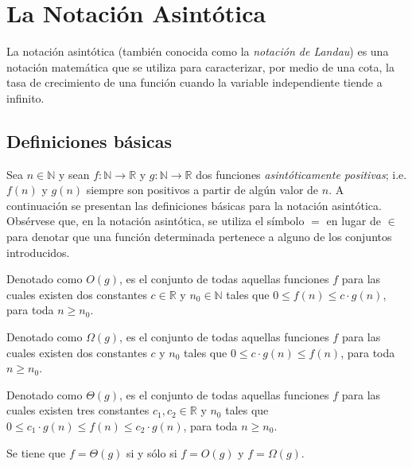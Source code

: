 
\chapter{La Notación Asintótica}

La notación asintótica (también conocida como la \emph{notación de
Landau}) es una notación matemática que se utiliza para caracterizar,
por medio de una cota, la tasa de crecimiento de una función cuando
la variable independiente tiende a infinito.

\section{Definiciones básicas}

Sea $n\in\mathbb{N}$ y sean $f:\mathbb{N}\to\mathbb{R}$ y $g:\mathbb{N}\to\mathbb{R}$
dos funciones \emph{asintóticamente positivas}; i.e. $f(n)$ y $g(n)$
siempre son positivos a partir de algún valor de $n$. A continuación
se presentan las definiciones básicas para la notación asintótica.
Obsérvese que, en la notación asintótica, se utiliza el símbolo $=$
en lugar de $\in$ para denotar que una función determinada pertenece
a alguno de los conjuntos introducidos.

\begin{defn}[O grande]
    Denotado como $O(g)$, es el conjunto de todas aquellas funciones
    $f$ para las cuales existen dos constantes $c\in\mathbb{R}$ y $n_{0}\in\mathbb{N}$
    tales que $0\le f(n)\leq c\cdot g(n)$, para toda $n\geq n_{0}$. 
\end{defn}

\begin{defn}
    Denotado como $\Omega(g)$, es el conjunto de todas aquellas funciones
    $f$ para las cuales existen dos constantes $c$ y $n_{0}$ tales
    que $0\le c\cdot g(n)\leq f(n)$, para toda $n\geq n_{0}$.
\end{defn}

\begin{defn}
    Denotado como $\Theta(g)$, es el conjunto de todas aquellas funciones
    $f$ para las cuales existen tres constantes $c_{1},c_{2}\in\mathbb{R}$
    y $n_{0}$ tales que $0\le c_{1}\cdot g(n)\leq f(n)\leq c_{2}\cdot g(n)$,
    para toda $n\geq n_{0}$.
\end{defn}

\begin{prop}
    Se tiene que $f=\Theta(g)$ si y sólo si $f=O(g)$ y $f=\Omega(g)$.
\end{prop}

